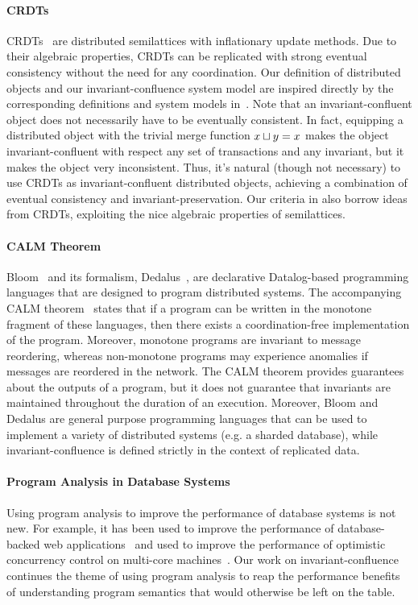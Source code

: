 \paragraph{CRDTs}
CRDTs~\cite{shapiro2011conflict, shapiro2011comprehensive} are distributed
semilattices with inflationary update methods. Due to their algebraic
properties, CRDTs can be replicated with strong eventual consistency without
the need for any coordination. Our definition of distributed objects and our
invariant-confluence system model are inspired directly by the corresponding
definitions and system models in~\cite{shapiro2011conflict}. Note that an
invariant-confluent object does not necessarily have to be eventually
consistent. In fact, equipping a distributed object with the trivial merge
function $x \sqcup y = x$ makes the object invariant-confluent with respect
any set of transactions and any invariant, but it makes the object very
inconsistent. Thus, it's natural (though not necessary) to use CRDTs as
invariant-confluent distributed objects, achieving a combination of eventual
consistency and invariant-preservation. Our criteria in
 also borrow ideas from CRDTs, exploiting the nice
algebraic properties of semilattices.

\paragraph{CALM Theorem}
Bloom~\cite{alvaro2010boom, alvaro2011consistency, conway2012logic} and its
formalism, Dedalus~\cite{alvaro2011dedalus, alvaro2013declarative}, are
declarative Datalog-based programming languages that are designed to program
distributed systems. The accompanying CALM
theorem~\cite{hellerstein2010declarative, ameloot2013relational} states that if
a program can be written in the monotone fragment of these languages, then
there exists a coordination-free implementation of the program. Moreover,
monotone programs are invariant to message reordering, whereas non-monotone
programs may experience anomalies if messages are reordered in the network. The
CALM theorem provides guarantees about the outputs of a program, but it does
not guarantee that invariants are maintained throughout the duration of an
execution. Moreover, Bloom and Dedalus are general purpose programming
languages that can be used to implement a variety of distributed systems (e.g.
a sharded database), while invariant-confluence is defined strictly in the
context of replicated data.

\paragraph{Program Analysis in Database Systems}
Using program analysis to improve the performance of database systems is not
new. For example, it has been used to improve the performance of
database-backed web applications~\cite{cheung2014using, wu2016transaction,
ramachandra2012program} and used to improve the performance of optimistic
concurrency control on multi-core machines~\cite{wu2016transaction}. Our work
on invariant-confluence continues the theme of using program analysis to reap
the performance benefits of understanding program semantics that would
otherwise be left on the table.

